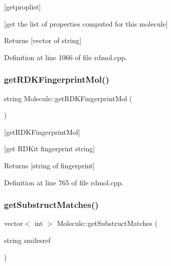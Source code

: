 \mbox{[}getproplist\mbox{]} 

\mbox{[}get the list of properties computed for this molecule\mbox{]} \begin{DoxyReturn}{Returns}
\mbox{[}vector of string\mbox{]} 
\end{DoxyReturn}


Definition at line 1066 of file rdmol.\+cpp.

\mbox{\label{class_molecule_aaace92222bb544e3682c894d4f1e9302}} 
\subsubsection{\texorpdfstring{get\+R\+D\+K\+Fingerprint\+Mol()}{getRDKFingerprintMol()}}
{\footnotesize\ttfamily string Molecule\+::get\+R\+D\+K\+Fingerprint\+Mol (\begin{DoxyParamCaption}{ }\end{DoxyParamCaption})}



\mbox{[}get\+R\+D\+K\+Fingerprint\+Mol\mbox{]} 

\mbox{[}get R\+D\+Kit fingerprint string\mbox{]}

\begin{DoxyReturn}{Returns}
\mbox{[}string of fingerprint\mbox{]} 
\end{DoxyReturn}


Definition at line 765 of file rdmol.\+cpp.

\mbox{\label{class_molecule_a5d33d9bf92166de9e58d6deadddc9fed}} 
\subsubsection{\texorpdfstring{get\+Substruct\+Matches()}{getSubstructMatches()}}
{\footnotesize\ttfamily vector$<$ int $>$ Molecule\+::get\+Substruct\+Matches (\begin{DoxyParamCaption}\item[{string}]{smilesref }\end{DoxyParamCaption})}



